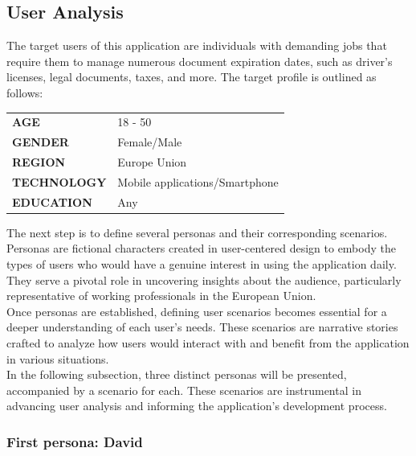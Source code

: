 \subsection{User Analysis}
The target users of this application are individuals with demanding jobs that require them to manage numerous document expiration dates, such as driver's licenses, legal documents, taxes, and more. The target profile is outlined as follows:
\begin{table}[H]
	\centering
	\begin{tabularx}{\textwidth}{XX}
		\textbf{AGE}& 18 - 50\\
		\textbf{GENDER}& Female/Male\\
		\textbf{REGION}& Europe Union\\
		\textbf{TECHNOLOGY}&Mobile applications/Smartphone\\
		\textbf{EDUCATION}& Any\\
	\end{tabularx}
\end{table}
\noindent
The next step is to define several personas and their corresponding scenarios. Personas are fictional characters created in user-centered design to embody the types of users who would have a genuine interest in using the application daily. They serve a pivotal role in uncovering insights about the audience, particularly representative of working professionals in the European Union.\\
Once personas are established, defining user scenarios becomes essential for a deeper understanding of each user's needs. These scenarios are narrative stories crafted to analyze how users would interact with and benefit from the application in various situations.\\
In the following subsection, three distinct personas will be presented, accompanied by a scenario for each. These scenarios are instrumental in advancing user analysis and informing the application's development process.\\
\subsubsection{First persona: David}

